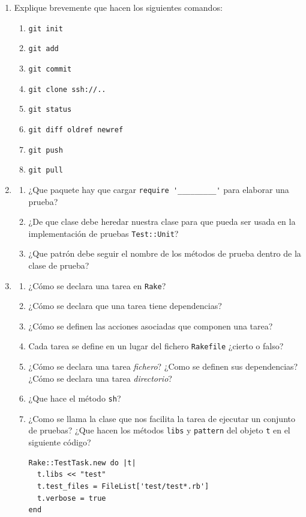 \begin{enumerate}
\begin{verbatim}
  def to_s
    @page.join("\n")
  end
end
\end{verbatim}
\item
Explique brevemente que hacen los siguientes comandos:
\begin{enumerate}
\item \verb|git init|
\item \verb|git add|
\item \verb|git commit|
\item \verb|git clone ssh://..|
\item \verb|git status|
\item \verb|git diff oldref newref|
\item \verb|git push|
\item \verb|git pull|
\end{enumerate}
\item %
\begin{enumerate}
\item ¿Que paquete hay que cargar \verb|require '_________'| para elaborar una prueba?
\item
¿De que clase debe heredar  nuestra clase para que pueda ser usada en la implementación
de pruebas \verb|Test::Unit|?
\item ¿Que patrón debe seguir el nombre de los métodos de prueba dentro de la clase de prueba?
\end{enumerate}
\item %
\begin{enumerate}
\item ¿Cómo se declara una tarea en \verb|Rake|?
\item ¿Cómo se declara que una tarea tiene dependencias?
\item ¿Cómo se definen las acciones asociadas que componen una tarea?
\item Cada tarea se define en un lugar del fichero \verb|Rakefile| ¿cierto o falso?
\item ¿Cómo se declara una tarea {\it fichero}? ¿Como se definen sus dependencias?
¿Cómo se declara una tarea {\it directorio}?
\item ¿Que hace el método \verb|sh|?
\item ¿Como se llama la clase que nos facilita la tarea de ejecutar un conjunto de pruebas?
¿Que hacen los métodos \verb|libs| y  \verb|pattern| del objeto \verb|t| en el siguiente código?
\begin{verbatim}
Rake::TestTask.new do |t|
  t.libs << "test"
  t.test_files = FileList['test/test*.rb']
  t.verbose = true
end
\end{verbatim}
\end{enumerate}
\end{enumerate}

